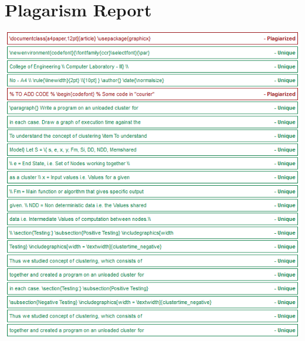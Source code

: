 \documentclass[a4paper,12pt]{article}
\begin{document}
\section{Plagarism Report}
	\includegraphics[width=\textwidth]{clustertime_plaga}
\end{document}
